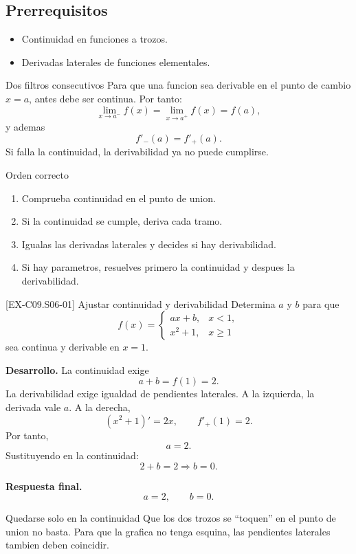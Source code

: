 \subsection*{Prerrequisitos}
\begin{itemize}
  \item Continuidad en funciones a trozos.
  \item Derivadas laterales de funciones elementales.
\end{itemize}

\begin{theorybox}{Dos filtros consecutivos}
Para que una funcion sea derivable en el punto de cambio \(x=a\), antes debe ser continua.
Por tanto:
\[
\lim_{x\to a^-}f(x)=\lim_{x\to a^+}f(x)=f(a),
\]
y ademas
\[
f'_-(a)=f'_+(a).
\]
Si falla la continuidad, la derivabilidad ya no puede cumplirse.
\end{theorybox}

\begin{methodbox}{Orden correcto}
\begin{enumerate}
  \item Comprueba continuidad en el punto de union.
  \item Si la continuidad se cumple, deriva cada tramo.
  \item Igualas las derivadas laterales y decides si hay derivabilidad.
  \item Si hay parametros, resuelves primero la continuidad y despues la derivabilidad.
\end{enumerate}
\end{methodbox}

\begin{solvedexample}{[EX-C09.S06-01] Ajustar continuidad y derivabilidad}
Determina \(a\) y \(b\) para que
\[
f(x)=
\begin{cases}
ax+b,& x<1,\\
x^2+1,& x\geq 1
\end{cases}
\]
sea continua y derivable en \(x=1\).

\textbf{Desarrollo.} La continuidad exige
\[
a+b=f(1)=2.
\]
La derivabilidad exige igualdad de pendientes laterales. A la izquierda, la derivada vale
\(a\). A la derecha,
\[
(x^2+1)'=2x,\qquad f'_+(1)=2.
\]
Por tanto,
\[
a=2.
\]
Sustituyendo en la continuidad:
\[
2+b=2 \Longrightarrow b=0.
\]

\textbf{Respuesta final.}
\[
a=2,\qquad b=0.
\]
\end{solvedexample}

\begin{commonerror}{Quedarse solo en la continuidad}
Que los dos trozos se ``toquen'' en el punto de union no basta. Para que la grafica no tenga
esquina, las pendientes laterales tambien deben coincidir.
\end{commonerror}

